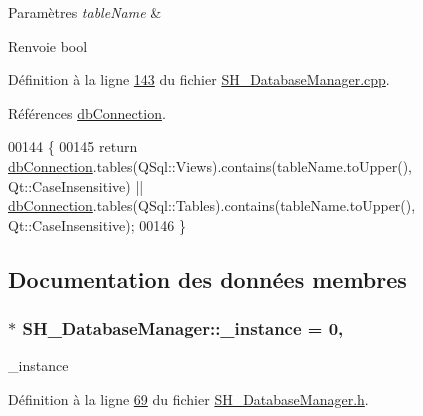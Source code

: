 \begin{DoxyParams}{Paramètres}
{\em table\-Name} & \\
\hline
\end{DoxyParams}
\begin{DoxyReturn}{Renvoie}
bool 
\end{DoxyReturn}


Définition à la ligne \hyperlink{SH__DatabaseManager_8cpp_source_l00143}{143} du fichier \hyperlink{SH__DatabaseManager_8cpp_source}{S\-H\-\_\-\-Database\-Manager.\-cpp}.



Références \hyperlink{classSH__DatabaseManager_a9291f61c3abbba2c4f1567b1d8325f0e}{db\-Connection}.


\begin{DoxyCode}
00144 \{
00145     \textcolor{keywordflow}{return} \hyperlink{classSH__DatabaseManager_a9291f61c3abbba2c4f1567b1d8325f0e}{dbConnection}.tables(QSql::Views).contains(tableName.toUpper(), Qt::CaseInsensitive) 
      || \hyperlink{classSH__DatabaseManager_a9291f61c3abbba2c4f1567b1d8325f0e}{dbConnection}.tables(QSql::Tables).contains(tableName.toUpper(), Qt::CaseInsensitive);
00146 \}
\end{DoxyCode}


\subsection{Documentation des données membres}
\hypertarget{classSH__DatabaseManager_a8ca37d0cafa6a181582d60e045a8d5ab}{
\subsubsection[{\-\_\-instance}]{ $\ast$ S\-H\-\_\-\-Database\-Manager\-::\-\_\-instance = 0\hspace{0.3cm}{\ttfamily [static]}, {\ttfamily [private]}}}\label{classSH__DatabaseManager_a8ca37d0cafa6a181582d60e045a8d5ab}


\-\_\-instance 



Définition à la ligne \hyperlink{SH__DatabaseManager_8h_source_l00069}{69} du fichier \hyperlink{SH__DatabaseManager_8h_source}{S\-H\-\_\-\-Database\-Manager.\-h}.



